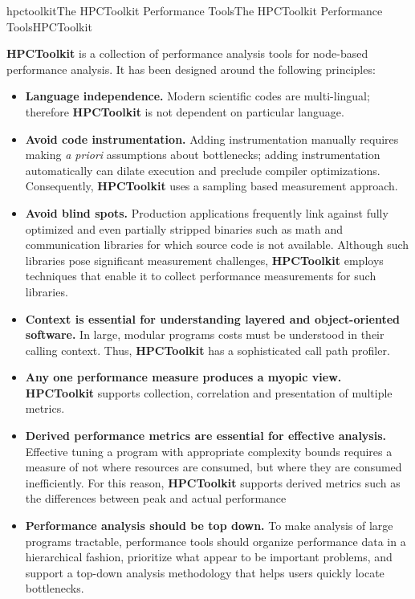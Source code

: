 \documentclass[english]{article}
\begin{document}
\begin{Name}{1}{hpctoolkit}{The HPCToolkit Performance Tools}{The HPCToolkit Performance Tools}{HPCToolkit}

\textbf{HPCToolkit} is a collection of performance analysis tools for node-based performance analysis.
It has been designed around the following principles:
\begin{itemize}

\item \textbf{Language independence.}
Modern scientific codes are multi-lingual; therefore \textbf{HPCToolkit} is not dependent on particular language.

\item \textbf{Avoid code instrumentation.}
Adding instrumentation manually requires making \emph{a priori} assumptions about bottlenecks; adding instrumentation automatically can dilate execution and preclude compiler optimizations.
Consequently, \textbf{HPCToolkit} uses a sampling based measurement approach.

\item \textbf{Avoid blind spots.}
Production applications frequently link against fully optimized and even partially stripped binaries such as math and communication libraries for which source code is not available.
Although such libraries pose significant measurement challenges, \textbf{HPCToolkit} employs techniques that enable it to collect performance measurements for such libraries.

\item \textbf{Context is essential for understanding layered and object-oriented software.}
In large, modular programs costs must be understood in their calling context.
Thus, \textbf{HPCToolkit} has a sophisticated call path profiler.

\item \textbf{Any one performance measure produces a myopic view.}
\textbf{HPCToolkit} supports collection, correlation and presentation of multiple metrics.

\item \textbf{Derived performance metrics are essential for effective analysis.}
Effective tuning a program with appropriate complexity bounds requires a measure of not where resources are consumed, but where they are consumed inefficiently.
For this reason, \textbf{HPCToolkit} supports derived metrics such as the differences between peak and actual performance 

\item \textbf{Performance analysis should be top down.}
To make analysis of large programs tractable, performance tools should organize performance data in a hierarchical fashion, prioritize what appear to be important problems, and support a top-down analysis methodology that helps users quickly locate bottlenecks.


\end{itemize}
\end{Name}
\end{document}
